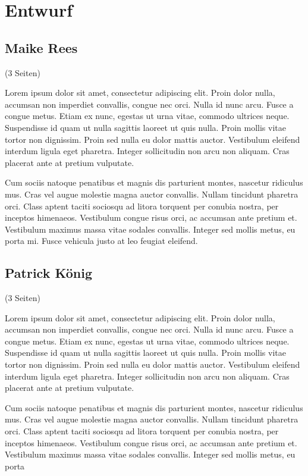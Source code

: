 \chapter{Entwurf}
\label{chap:entwurf}

\section{Maike Rees}
\label{sec:rees}

(3 Seiten)

Lorem ipsum dolor sit amet, consectetur adipiscing elit. Proin dolor nulla, accumsan non imperdiet convallis, congue nec orci. Nulla id nunc arcu. Fusce a congue metus. Etiam ex nunc, egestas ut urna vitae, commodo ultrices neque. Suspendisse id quam ut nulla sagittis laoreet ut quis nulla. Proin mollis vitae tortor non dignissim. Proin sed nulla eu dolor mattis auctor. Vestibulum eleifend interdum ligula eget pharetra. Integer sollicitudin non arcu non aliquam. Cras placerat ante at pretium vulputate.

Cum sociis natoque penatibus et magnis dis parturient montes, nascetur ridiculus mus. Cras vel augue molestie magna auctor convallis. Nullam tincidunt pharetra orci. Class aptent taciti sociosqu ad litora torquent per conubia nostra, per inceptos himenaeos. Vestibulum congue risus orci, ac accumsan ante pretium et. Vestibulum maximus massa vitae sodales convallis. Integer sed mollis metus, eu porta mi. Fusce vehicula justo at leo feugiat eleifend.


\clearpage
\section{Patrick König}
\label{sec:koenig}

(3 Seiten)

Lorem ipsum dolor sit amet, consectetur adipiscing elit. Proin dolor nulla, accumsan non imperdiet convallis, congue nec orci. Nulla id nunc arcu. Fusce a congue metus. Etiam ex nunc, egestas ut urna vitae, commodo ultrices neque. Suspendisse id quam ut nulla sagittis laoreet ut quis nulla. Proin mollis vitae tortor non dignissim. Proin sed nulla eu dolor mattis auctor. Vestibulum eleifend interdum ligula eget pharetra. Integer sollicitudin non arcu non aliquam. Cras placerat ante at pretium vulputate.

Cum sociis natoque penatibus et magnis dis parturient montes, nascetur ridiculus mus. Cras vel augue molestie magna auctor convallis. Nullam tincidunt pharetra orci. Class aptent taciti sociosqu ad litora torquent per conubia nostra, per inceptos himenaeos. Vestibulum congue risus orci, ac accumsan ante pretium et. Vestibulum maximus massa vitae sodales convallis. Integer sed mollis metus, eu porta

